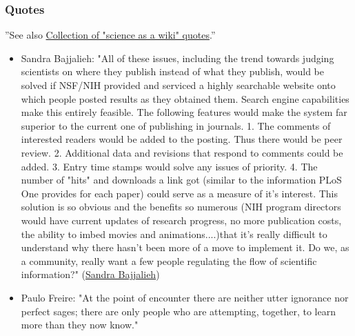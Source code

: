 \documentclass[final,authoryear,3p]{elsarticle-open-drafting}
\begin{document}
\subsubsection{Quotes}
''See also \href{http://www.science3point0.com/coaspedia/index.php/User:Daniel_Mietchen/Talks/Slides/Quotes}{Collection of "science as a wiki" quotes}.''
\begin{itemize}
	\item  Sandra Bajjalieh: "All of these issues, including the trend towards judging scientists on where they publish instead of what they publish, would be solved if NSF/NIH provided and serviced a highly searchable website onto which people posted results as they obtained them. Search engine capabilities make this entirely feasible. The following features would make the system far superior to the current one of publishing in journals. 1. The comments of interested readers would be added to the posting. Thus there would be peer review. 2. Additional data and revisions that respond to comments could be added. 3. Entry time stamps would solve any issues of priority. 4. The number of "hits" and downloads a link got (similar to the information PLoS One provides for each paper) could serve as a measure of it's interest. This solution is so obvious and the benefits so numerous (NIH program directors would have current updates of research progress, no more publication costs, the ability to imbed movies and animations....)that it's really difficult to understand why there hasn't been more of a move to implement it. Do we, as a community, really want a few people regulating the flow of scientific information?" (\href{http://www.nature.com/news/2011/110427/full/472391a.html}{Sandra Bajjalieh})
	
	\item  Paulo Freire: "At the point of encounter there are neither utter ignorance nor perfect sages; there are only people who are attempting, together, to learn more than they now know." 


\end{itemize}
\end{document}
